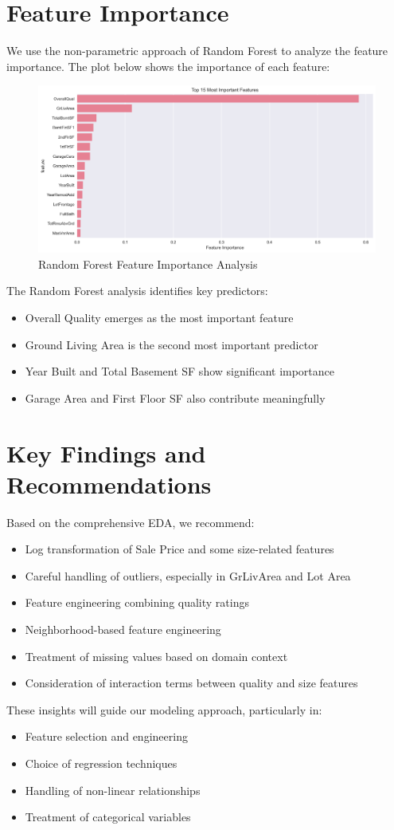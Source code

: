 \section{Feature Importance}
We use the non-parametric approach of Random Forest to analyze the feature importance. The plot below shows the importance of each feature:
\begin{figure}[H]
    \centering
    \includegraphics[width=1.0\textwidth]{figures/feature_importance.png}
    \caption{Random Forest Feature Importance Analysis}
    \label{fig:feature_importance}
\end{figure}

The Random Forest analysis identifies key predictors:
\begin{itemize}
    \item Overall Quality emerges as the most important feature
    \item Ground Living Area is the second most important predictor
    \item Year Built and Total Basement SF show significant importance
    \item Garage Area and First Floor SF also contribute meaningfully
\end{itemize}

\section{Key Findings and Recommendations}
Based on the comprehensive EDA, we recommend:
\begin{itemize}
    \item Log transformation of Sale Price and some size-related features
    \item Careful handling of outliers, especially in GrLivArea and Lot Area
    \item Feature engineering combining quality ratings
    \item Neighborhood-based feature engineering
    \item Treatment of missing values based on domain context
    \item Consideration of interaction terms between quality and size features
\end{itemize}

These insights will guide our modeling approach, particularly in:
\begin{itemize}
    \item Feature selection and engineering
    \item Choice of regression techniques
    \item Handling of non-linear relationships
    \item Treatment of categorical variables
\end{itemize}